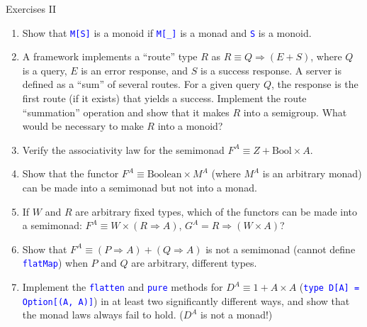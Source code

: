 \documentclass[english]{beamer}
\begin{document}
\begin{frame}{Exercises II}
\begin{enumerate}
\item \vspace*{-0.2cm}Show that \texttt{\textcolor{blue}{\footnotesize{}M{[}S{]}}}
is a monoid if \texttt{\textcolor{blue}{\footnotesize{}M{[}\_{]}}}
is a monad and \texttt{\textcolor{blue}{\footnotesize{}S}} is a monoid.
\item A framework implements a ``route'' type $R$ as $R\equiv Q\Rightarrow\left(E+S\right)$,
where $Q$ is a query, $E$ is an error response, and $S$ is a success
response. A server is defined as a ``sum'' of several routes. For
a given query $Q$, the response is the first route (if it exists)
that yields a success. Implement the route ``summation'' operation
and show that it makes $R$ into a semigroup. What would be necessary
to make $R$ into a monoid?
\item Verify the associativity law for the semimonad $F^{A}\equiv Z+\text{Bool}\times A$.
\item Show that the functor $F^{A}\equiv\text{Boolean}\times M^{A}$ (where
$M^{A}$ is an arbitrary monad) can be made into a semimonad but not
into a monad.
\item If $W$ and $R$ are arbitrary fixed types, which of the functors
can be made into a semimonad: $F^{A}\equiv W\times\left(R\Rightarrow A\right)$,
$G^{A}=R\Rightarrow\left(W\times A\right)$?
\item Show that $F^{A}\equiv\left(P\Rightarrow A\right)+\left(Q\Rightarrow A\right)$
is not a semimonad (cannot define \texttt{\textcolor{blue}{\footnotesize{}flatMap}})
when $P$ and $Q$ are arbitrary, different types.
\item Implement the \texttt{\textcolor{blue}{\footnotesize{}flatten}} and
\texttt{\textcolor{blue}{\footnotesize{}pure}} methods for $D^{A}\equiv1+A\times A$
(\texttt{\textcolor{blue}{\footnotesize{}type D{[}A{]} = Option{[}(A,
A){]}}}) in at least two significantly different ways, and show that
the monad laws always fail to hold. ($D^{A}$ is not a monad!)
\end{enumerate}
\end{frame}
\end{document}
